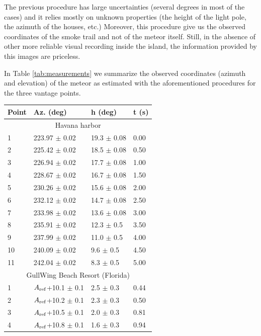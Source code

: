 \documentclass[fleqn,usenatbib]{mnras}
\begin{document}
The previous procedure has large uncertainties (several degrees in most of the cases) and it relies mostly on unknown properties (the height of the light pole, the azimuth of the houses, etc.)  Moreover, this procedure give us the observed coordinates of the smoke trail and not of the meteor itself.  Still, in the absence of other more reliable visual recording inside the island, the information provided by this images are priceless.

\bigskip

In Table \ref{tab:measurements} we summarize the observed coordinates (azimuth and elevation) of the meteor as estimated with the aforementioned procedures for the three vantage points.

\begin{table}
\centering
\begin{tabular}{llll}
\hline\hline
Point & Az. (deg) & h (deg) & t (s)\\
\hline\multicolumn{4}{c}{Havana harbor}\\\hline
1 & 223.97 $\pm$ 0.02 & 19.3 $\pm$ 0.08 & 0.00 \\
2 & 225.42 $\pm$ 0.02 & 18.5 $\pm$ 0.08 & 0.50 \\
3 & 226.94 $\pm$ 0.02 & 17.7 $\pm$ 0.08 & 1.00 \\
4 & 228.67 $\pm$ 0.02 & 16.7 $\pm$ 0.08 & 1.50 \\
5 & 230.26 $\pm$ 0.02 & 15.6 $\pm$ 0.08 & 2.00 \\
6 & 232.12 $\pm$ 0.02 & 14.7 $\pm$ 0.08 & 2.50 \\
7 & 233.98 $\pm$ 0.02 & 13.6 $\pm$ 0.08 & 3.00 \\
8 & 235.91 $\pm$ 0.02 & 12.3 $\pm$ 0.5 & 3.50 \\
9 & 237.99 $\pm$ 0.02 & 11.0 $\pm$ 0.5 & 4.00 \\
10 & 240.09 $\pm$ 0.02 & 9.6 $\pm$ 0.5 & 4.50 \\
11 & 242.04 $\pm$ 0.02 & 8.3 $\pm$ 0.5 & 5.00 \\
\hline\multicolumn{4}{c}{GullWing Beach Resort (Florida)}\\\hline
1 & $A_{\rm ref}$+10.1 $\pm$ 0.1 & 2.5 $\pm$ 0.3 & 0.44 \\
2 & $A_{\rm ref}$+10.2 $\pm$ 0.1 & 2.3 $\pm$ 0.3 & 0.50 \\
3 & $A_{\rm ref}$+10.5 $\pm$ 0.1 & 2.0 $\pm$ 0.3 & 0.81 \\
4 & $A_{\rm ref}$+10.8 $\pm$ 0.1 & 1.6 $\pm$ 0.3 & 0.94 \\

\end{tabular}
\end{table}
\end{document}
